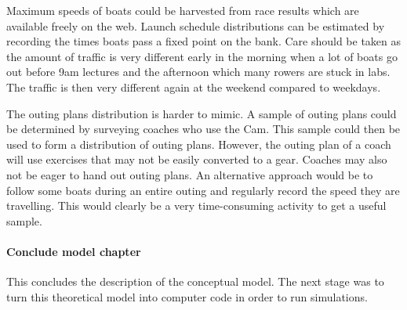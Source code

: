Maximum speeds of boats could be harvested from race results which are available freely on the web. Launch schedule distributions can be estimated by recording the times boats pass a fixed point on the bank. Care should be taken as the amount of traffic is very different early in the morning when a lot of boats go out before 9am lectures and the afternoon which many rowers are stuck in labs. The traffic is then very different again at the weekend compared to weekdays.

The outing plans distribution is harder to mimic. A sample of outing plans could be determined by surveying coaches who use the Cam. This sample could then be used to form a distribution of outing plans. However, the outing plan of a coach will use exercises that may not be easily converted to a gear. Coaches may also not be eager to hand out outing plans. An alternative approach would be to follow some boats during an entire outing and regularly record the speed they are travelling. This would clearly be a very time-consuming activity to get a useful sample.

\paragraph{Conclude model chapter}
This concludes the description of the conceptual model. The next stage was to turn this theoretical model into computer code in order to run simulations.
